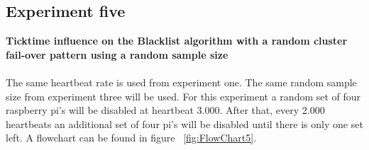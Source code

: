 \subsection{Experiment five}
\textbf{Ticktime influence on the Blacklist algorithm with a random cluster fail-over pattern using a random sample size}
\\~\\
The same heartbeat rate is used from experiment one. The same random sample size from experiment three will be used. For this experiment a random set of four raspberry pi's will be disabled at heartbeat 3.000. After that, every 2.000 heartbeats an additional set of four pi's will be disabled until there is only one set left. A flowchart can be found in figure ~\ref{fig:FlowChart5}.

\begin{figure}[htb]
	\centering

\end{figure}
